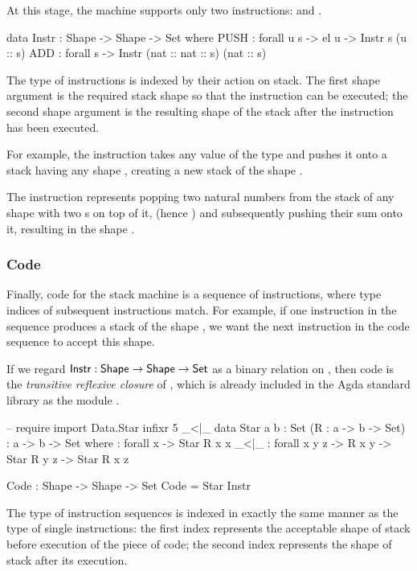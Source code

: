 At this stage, the machine supports only two instructions: 
and .
\begin{code}
  data Instr : Shape -> Shape -> Set where
    PUSH : forall {u s} -> el u -> Instr s (u :: s)
    ADD : forall s -> Instr (nat :: nat :: s) (nat :: s)
\end{code}
The type of instructions is indexed by their action on stack. The first shape
argument is the required stack shape so that the instruction can be executed;
the second shape argument is the resulting shape of the stack after the
instruction has been executed.

For example, the instruction  takes any value of the type 
and pushes it onto a stack having any shape , creating a new
stack of the shape .

The instruction  represents popping two natural numbers from the
stack of any shape with two s on top of it, (hence
)
and subsequently pushing their sum onto it, resulting in the shape
.

\subsubsection{Code}

Finally, code for the stack machine is a sequence of instructions, where
type indices of subsequent instructions match. For example, if one instruction
in the sequence produces a stack of the shape ,
we want the next instruction in the code sequence to accept this shape.

If we regard
$\mathsf{Instr} : \mathsf{Shape} \to \mathsf{Shape} \to \mathsf{Set}$
as a binary relation on , then code is the \emph{transitive reflexive closure}
of , which is already included in the Agda standard library as the
module .

\begin{code}
  -- require import Data.Star
  infixr 5 _<|_
  data Star {a b : Set} (R : a -> b -> Set) : a -> b -> Set where
    \nil : forall {x} -> Star R x x
    _<|_ : forall {x y z} -> R x y -> Star R y z -> Star R x z

  Code : Shape -> Shape -> Set
  Code = Star Instr
\end{code}

\noindent The type of instruction sequences is indexed in exactly the same
manner as the type of single instructions: the first index represents the
acceptable shape of stack before execution of the piece of code; the second
index represents the shape of stack after its execution.

